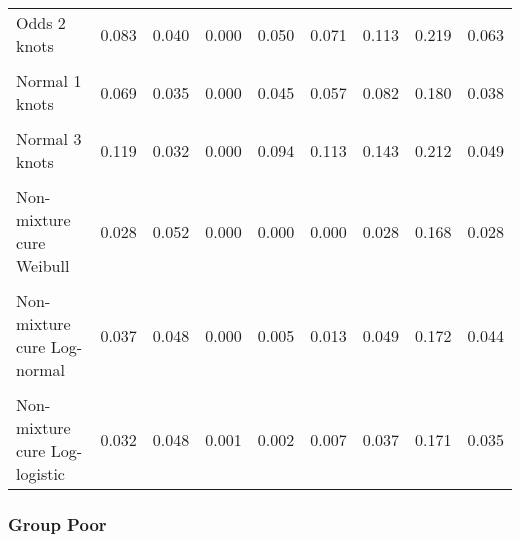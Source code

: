 \documentclass[
]{article}
\begin{document}
\begin{table}[H]
{\begin{tabular}[t]{lrrrrrrrr}
Odds 2 knots & 0.083 & 0.040 & 0.000 & 0.050 & 0.071 & 0.113 & 0.219 & 0.063\\
\cellcolor{gray!10}{Odds 3 knots} & \cellcolor{gray!10}{0.094} & \cellcolor{gray!10}{0.042} & \cellcolor{gray!10}{0.000} & \cellcolor{gray!10}{0.058} & \cellcolor{gray!10}{0.082} & \cellcolor{gray!10}{0.126} & \cellcolor{gray!10}{0.212} & \cellcolor{gray!10}{0.067}\\
Normal 1 knots & 0.069 & 0.035 & 0.000 & 0.045 & 0.057 & 0.082 & 0.180 & 0.038\\
\cellcolor{gray!10}{Normal 2 knots} & \cellcolor{gray!10}{0.093} & \cellcolor{gray!10}{0.032} & \cellcolor{gray!10}{0.000} & \cellcolor{gray!10}{0.068} & \cellcolor{gray!10}{0.085} & \cellcolor{gray!10}{0.116} & \cellcolor{gray!10}{0.201} & \cellcolor{gray!10}{0.048}\\
Normal 3 knots & 0.119 & 0.032 & 0.000 & 0.094 & 0.113 & 0.143 & 0.212 & 0.049\\
\cellcolor{gray!10}{Mixture cure Weibull} & \cellcolor{gray!10}{0.027} & \cellcolor{gray!10}{0.052} & \cellcolor{gray!10}{0.000} & \cellcolor{gray!10}{0.000} & \cellcolor{gray!10}{0.000} & \cellcolor{gray!10}{0.019} & \cellcolor{gray!10}{0.167} & \cellcolor{gray!10}{0.019}\\
Non-mixture cure Weibull & 0.028 & 0.052 & 0.000 & 0.000 & 0.000 & 0.028 & 0.168 & 0.028\\
\cellcolor{gray!10}{Mixture cure Log-normal} & \cellcolor{gray!10}{0.039} & \cellcolor{gray!10}{0.050} & \cellcolor{gray!10}{0.000} & \cellcolor{gray!10}{0.004} & \cellcolor{gray!10}{0.013} & \cellcolor{gray!10}{0.057} & \cellcolor{gray!10}{0.168} & \cellcolor{gray!10}{0.053}\\
Non-mixture cure Log-normal & 0.037 & 0.048 & 0.000 & 0.005 & 0.013 & 0.049 & 0.172 & 0.044\\
\cellcolor{gray!10}{Mixture cure Log-logistic} & \cellcolor{gray!10}{0.034} & \cellcolor{gray!10}{0.049} & \cellcolor{gray!10}{0.001} & \cellcolor{gray!10}{0.003} & \cellcolor{gray!10}{0.009} & \cellcolor{gray!10}{0.042} & \cellcolor{gray!10}{0.171} & \cellcolor{gray!10}{0.039}\\
Non-mixture cure Log-logistic & 0.032 & 0.048 & 0.001 & 0.002 & 0.007 & 0.037 & 0.171 & 0.035\\
\bottomrule
\end{tabular}}
\end{table}

\clearpage

\subsubsection{Group Poor}\label{group-poor}
\end{document}

